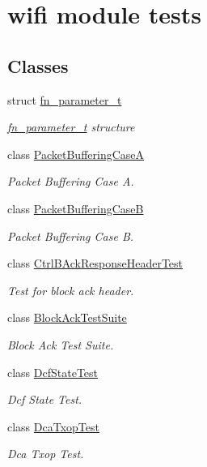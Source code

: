 \hypertarget{group__wifi-test}{}\section{wifi module tests}
\label{group__wifi-test}
\subsection*{Classes}
\begin{DoxyCompactItemize}
\item 
struct \hyperlink{structfn__parameter__t}{fn\+\_\+parameter\+\_\+t}
\begin{DoxyCompactList}\small\item\em \hyperlink{structfn__parameter__t}{fn\+\_\+parameter\+\_\+t} structure \end{DoxyCompactList}\item 
class \hyperlink{classPacketBufferingCaseA}{Packet\+Buffering\+CaseA}
\begin{DoxyCompactList}\small\item\em Packet Buffering Case A. \end{DoxyCompactList}\item 
class \hyperlink{classPacketBufferingCaseB}{Packet\+Buffering\+CaseB}
\begin{DoxyCompactList}\small\item\em Packet Buffering Case B. \end{DoxyCompactList}\item 
class \hyperlink{classCtrlBAckResponseHeaderTest}{Ctrl\+B\+Ack\+Response\+Header\+Test}
\begin{DoxyCompactList}\small\item\em Test for block ack header. \end{DoxyCompactList}\item 
class \hyperlink{classBlockAckTestSuite}{Block\+Ack\+Test\+Suite}
\begin{DoxyCompactList}\small\item\em Block Ack Test Suite. \end{DoxyCompactList}\item 
class \hyperlink{classDcfStateTest}{Dcf\+State\+Test}
\begin{DoxyCompactList}\small\item\em Dcf State Test. \end{DoxyCompactList}\item 
class \hyperlink{classDcaTxopTest}{Dca\+Txop\+Test}
\begin{DoxyCompactList}\small\item\em Dca Txop Test. \end{DoxyCompactList}\item 

\end{DoxyCompactItemize}

